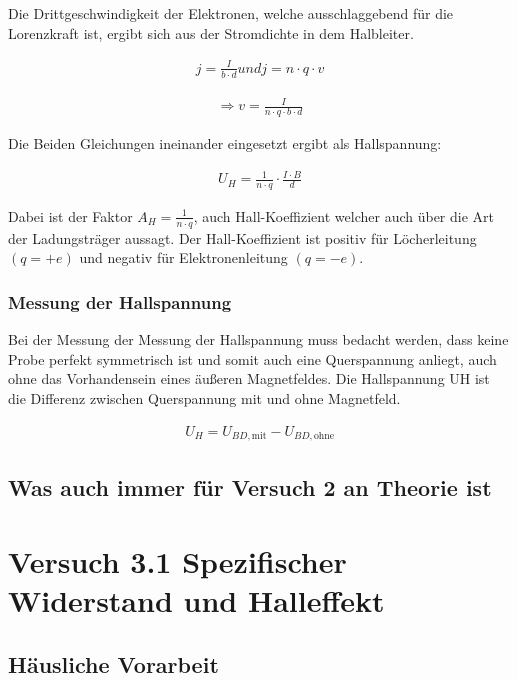 \documentclass[a4paper]{scrartcl}
\numberwithin{equation}{subsection}
\begin{document}
Die Drittgeschwindigkeit der Elektronen, welche ausschlaggebend für die Lorenzkraft ist, ergibt sich aus der Stromdichte in dem Halbleiter. \cite{anl}

\begin{align}
j = \frac{I}{b \cdot d} und j = n \cdot q \cdot v
\end{align}

\begin{align}
\Rightarrow v = \frac{I}{n \cdot q \cdot b \cdot d}
\end{align}

Die Beiden Gleichungen ineinander eingesetzt ergibt als Hallspannung:

\begin{align}
U_H = \frac{1}{n \cdot q} \cdot \frac{I \cdot B}{d}
\end{align}

Dabei ist der Faktor $A_H = \frac{1}{n \cdot q}$, auch Hall-Koeffizient welcher auch über die Art der Ladungsträger aussagt. Der Hall-Koeffizient ist positiv für Löcherleitung $(q = +e)$ und negativ für Elektronenleitung $(q = -e)$. \cite{anl}

\subsubsection{Messung der Hallspannung}

Bei der Messung der Messung der Hallspannung muss bedacht werden, dass keine Probe perfekt symmetrisch ist und somit auch eine Querspannung anliegt, auch ohne das Vorhandensein eines äußeren Magnetfeldes. Die Hallspannung UH ist die Differenz zwischen Querspannung mit und ohne Magnetfeld. \cite{anl}

\begin{align}
U_H = U_{BD,\text{mit}} - U_{BD,\text{ohne}}
\end{align}

\subsection{Was auch immer für Versuch 2 an Theorie ist}


\newpage

\section{Versuch 3.1 Spezifischer Widerstand und Halleffekt}
\subsection{Häusliche Vorarbeit}
\end{document}
